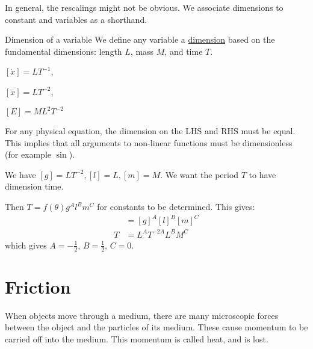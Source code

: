 \documentclass[../Main.tex]{subfiles}
\begin{document}
In general, the rescalings might not be obvious. We associate dimensions to constant and variables as a shorthand.\par
\begin{definition}{Dimension of a variable}
    We define any variable a \underline{dimension} based on the fundamental dimensions: length $L$, mass $M$, and time $T$.
\end{definition}
\begin{examples}{}
    \item $[\dot{x}] = LT^{-1}$,
    \item $[\ddot{x}] = LT^{-2}$,
    \item $[E] = ML^2 T^{-2}$
\end{examples}
For any physical equation, the dimension on the LHS and RHS must be equal. This implies that all arguments to non-linear functions must be dimensionless (for example $\sin$).
\begin{example}
    We have $[g] = LT^{-2}, [l] = L, [m] = M$. We want the period $T$ to have dimension time.\par
    Then $T = f(\theta) g^A l^B m^C$ for constants to be determined. This gives:
    \begin{align*}
        [T] &= [g]^A[l]^B[m]^C \\
        T &= L^A T^{-2A} L^B M^C
    \end{align*}
    which gives $A = -\frac{1}{2}$, $B = \frac{1}{2}$, $C = 0$.
\end{example}
\section{Friction}
When objects move through a medium, there are many microscopic forces between the object and the particles of its medium. These cause momentum to be carried off into the medium. This momentum is called heat, and is lost.
\end{document}
